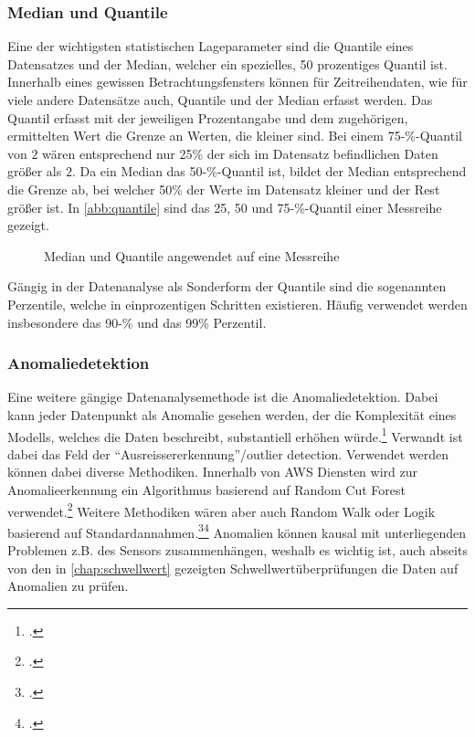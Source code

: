 \subsubsection{Median und Quantile}
Eine der wichtigsten statistischen Lageparameter sind die Quantile eines Datensatzes und der Median, welcher ein spezielles, 50 prozentiges Quantil ist. 
Innerhalb eines gewissen Betrachtungsfensters können für Zeitreihendaten, wie für viele andere Datensätze auch, Quantile und der Median erfasst werden. 
Das Quantil erfasst mit der jeweiligen Prozentangabe und dem zugehörigen, ermittelten Wert die Grenze an Werten, die kleiner sind. 
Bei einem 75-\%-Quantil von $2$ wären entsprechend nur 25\% der sich im Datensatz befindlichen Daten größer als $2$. 
Da ein Median das 50-\%-Quantil ist, bildet der Median entsprechend die Grenze ab, bei welcher 50\% der Werte im Datensatz kleiner und der Rest größer ist. In \autoref{abb:quantile} sind das 25, 50 und 75-\%-Quantil einer Messreihe gezeigt.
\begin{figure}[H]
\centering
{}
\caption{Median und Quantile angewendet auf eine Messreihe}
\label{abb:quantile}
\end{figure}

Gängig in der Datenanalyse als Sonderform der Quantile sind die sogenannten Perzentile, welche in einprozentigen Schritten existieren. Häufig verwendet werden insbesondere das 90-\% und das 99\% Perzentil.

\subsubsection{Anomaliedetektion}
Eine weitere gängige Datenanalysemethode ist die Anomaliedetektion. 
Dabei kann jeder Datenpunkt als Anomalie gesehen werden, der die Komplexität eines Modells, welches die Daten beschreibt, substantiell erhöhen würde.\footcite[Vgl.][]{Guha.2016} Verwandt ist dabei das Feld der \enquote{Ausreissererkennung}/outlier detection. 
Verwendet werden können dabei diverse Methodiken. Innerhalb von \ac{AWS} Diensten wird zur Anomalieerkennung ein Algorithmus basierend auf Random Cut Forest verwendet.\footcite[Vgl.][1]{Guha.2016} Weitere Methodiken wären aber auch Random Walk oder Logik basierend auf Standardannahmen.\footcite[Vgl.][]{Moonesinghe.2006}\nzitat\footcite[Vgl.][]{Angiulli.2008} Anomalien können kausal mit unterliegenden Problemen z.B. des Sensors zusammenhängen, weshalb es wichtig ist, auch abseits von den in \autoref{chap:schwellwert} gezeigten Schwellwertüberprüfungen die Daten auf Anomalien zu prüfen.

